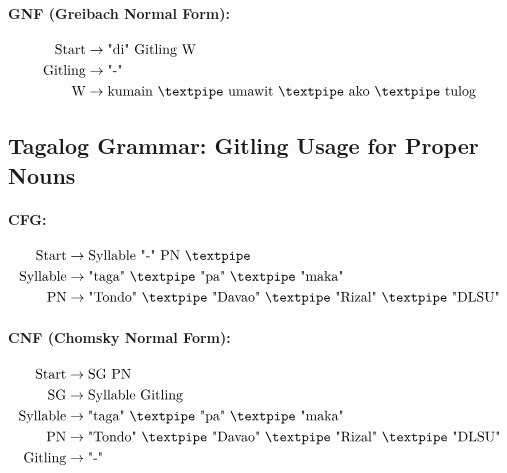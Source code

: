 \paragraph{GNF (Greibach Normal Form):}

\begin{equation*}
    \begin{aligned}
        \text{Start}   & \rightarrow \text{"di" Gitling W}\\
        \text{Gitling} & \rightarrow \text{"-"}\\
        \text{W} & \rightarrow \text{kumain {\textpipe} umawit {\textpipe} ako {\textpipe} tulog}   \\
    \end{aligned}
\end{equation*}

\subsection{Tagalog Grammar: Gitling Usage for Proper Nouns}

\paragraph{CFG:}

\begin{equation*}
    \begin{aligned}
        \text{Start}  & \rightarrow \text{Syllable "-" PN {\textpipe}}   \\
        \text{Syllable}    & \rightarrow \text{"taga" {\textpipe} "pa" {\textpipe} "maka"}\\
        \text{PN} & \rightarrow \text{"Tondo" {\textpipe} "Davao" {\textpipe} "Rizal" {\textpipe} "DLSU"}   \\
    \end{aligned}
\end{equation*}

\paragraph{CNF (Chomsky Normal Form):}

\begin{equation*}
    \begin{aligned}
        \text{Start}   & \rightarrow \text{SG PN} \\
        \text{SG}      & \rightarrow \text{Syllable Gitling}\\
        \text{Syllable}    & \rightarrow \text{"taga" {\textpipe} "pa" {\textpipe} "maka"}\\
        \text{PN} & \rightarrow \text{"Tondo" {\textpipe} "Davao" {\textpipe} "Rizal" {\textpipe} "DLSU"}   \\
        \text{Gitling} & \rightarrow \text{"-"}\\
    \end{aligned}
\end{equation*}

